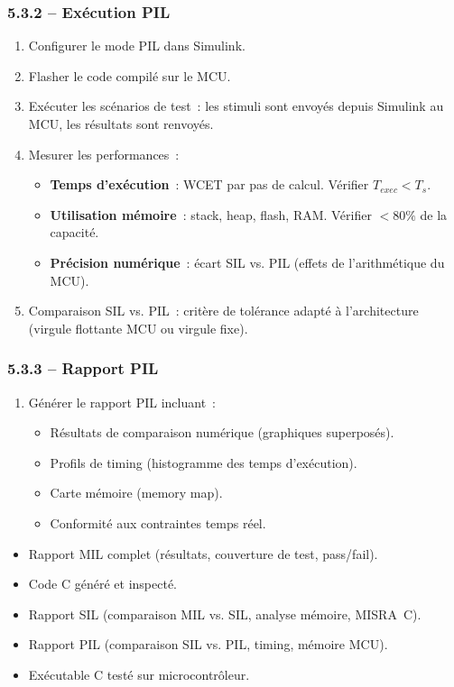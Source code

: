 \documentclass[a4paper,12pt]{article}
\begin{document}
\subsubsection{5.3.2 -- Exécution PIL}
\begin{enumerate}[nosep]
  \item Configurer le mode PIL dans Simulink.
  \item Flasher le code compilé sur le MCU.
  \item Exécuter les scénarios de test~: les stimuli sont envoyés depuis Simulink au MCU, les résultats sont renvoyés.
  \item Mesurer les performances~:
    \begin{itemize}[nosep]
      \item \textbf{Temps d'exécution}~: WCET par pas de calcul. Vérifier $T_{exec} < T_s$.
      \item \textbf{Utilisation mémoire}~: stack, heap, flash, RAM. Vérifier $<80\%$ de la capacité.
      \item \textbf{Précision numérique}~: écart SIL vs. PIL (effets de l'arithmétique du MCU).
    \end{itemize}
  \item Comparaison SIL vs. PIL~: critère de tolérance adapté à l'architecture (virgule flottante MCU ou virgule fixe).
\end{enumerate}

\subsubsection{5.3.3 -- Rapport PIL}
\begin{enumerate}[nosep]
  \item Générer le rapport PIL incluant~:
    \begin{itemize}[nosep]
      \item Résultats de comparaison numérique (graphiques superposés).
      \item Profils de timing (histogramme des temps d'exécution).
      \item Carte mémoire (memory map).
      \item Conformité aux contraintes temps réel.
    \end{itemize}
\end{enumerate}

\begin{deliverablebox}
\begin{itemize}[nosep]
  \item Rapport MIL complet (résultats, couverture de test, pass/fail).
  \item Code C généré et inspecté.
  \item Rapport SIL (comparaison MIL vs. SIL, analyse mémoire, MISRA~C).
  \item Rapport PIL (comparaison SIL vs. PIL, timing, mémoire MCU).
  \item Exécutable C testé sur microcontrôleur.
\end{itemize}
\end{deliverablebox}
\end{document}

